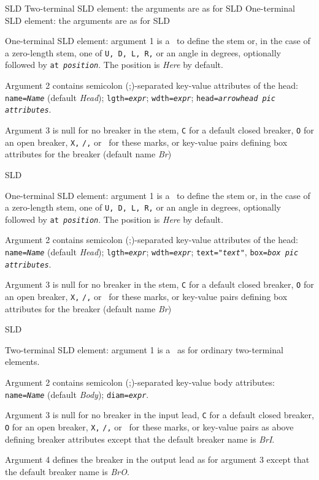%
  {SLD}%
  {Two-terminal SLD element: the arguments are as for 
   }%
%
  {SLD}%
  {One-terminal SLD element: the arguments are as for 
   }%
%
  {SLD}%
  {One-terminal SLD element: argument 1 is a \linespec\ to define the stem
   or, in the case of a zero-length stem, one of {\tt U, D, L, R,} or an
   angle in degrees, optionally followed by {\tt at {\sl position}}.
   The position is {\sl Here} by default.

   Argument 2 contains semicolon (;)-separated key-value attributes
   of the head:
   {\tt name={\sl{}Name}} (default {\sl Head});
   {\tt lgth={\sl{}expr}};
   {\tt wdth={\sl{}expr}};
   {\tt head={\sl{}arrowhead pic attributes}}.

   Argument 3 is null for no breaker in the stem, {\tt C} for a default
   closed breaker, {\tt O} for an open breaker, {\tt X,} {\tt /,} or \bsl\ for
   these marks, or
   key-value pairs defining box attributes for the breaker
   (default name {\sl Br})
   }%
%
  {SLD}%
  {One-terminal SLD element: argument 1 is a \linespec\ to define the stem
   or, in the case of a zero-length stem, one of {\tt U, D, L, R,} or an
   angle in degrees, optionally followed by {\tt at {\sl position}}.
   The position is {\sl Here} by default.

   Argument 2 contains semicolon (;)-separated key-value attributes
   of the head:
   {\tt name={\sl{}Name}} (default {\sl Head});
   {\tt lgth={\sl{}expr}};
   {\tt wdth={\sl{}expr}};
   {\tt text="{\sl{}text}"},
   {\tt box={\sl{}box pic attributes}}.

   Argument 3 is null for no breaker in the stem, {\tt C} for a default
   closed breaker, {\tt O} for an open breaker, {\tt X,} {\tt /,} or \bsl\ for
   these marks, or
   key-value pairs defining box attributes for the breaker
   (default name {\sl Br})
   }%
%
  {SLD}%
  {Two-terminal SLD element: argument 1 is a \linespec\ as for ordinary
   two-terminal elements.

   Argument 2 contains semicolon (;)-separated key-value body attributes:
   {\tt name={\sl{}Name}} (default {\sl Body});
   {\tt diam={\sl{}expr}}.

   Argument 3 is null for no breaker in the input lead, {\tt C} for a default
   closed breaker, {\tt O} for an open breaker, {\tt X,} {\tt /,} or \bsl\ for
   these marks, or
   key-value pairs as above defining breaker attributes
   except that the default breaker name is {\sl BrI}.

   Argument 4 defines the breaker in the output lead as for argument 3
   except that the default breaker name is {\sl BrO}.
   }%
